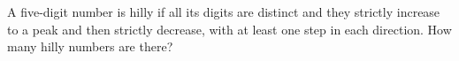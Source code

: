 A five-digit number is hilly if all its digits are distinct and they strictly increase to a peak and then strictly decrease, with at least one step in each direction. How many hilly numbers are there?
